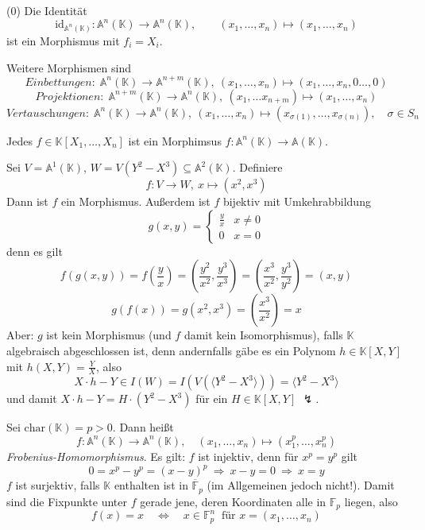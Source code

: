 \documentclass[11pt]{book}
\theoremstyle{nonumberbreak}
\newenvironment{ex}[1][]{\ifthenelse{\equal{#1}{}}{\example}{\example[#1]}\rm}{\endexample}
\begin{document}
\begin{spacing}{1.3}
\begin{ex} %
\begin{compactenum}
\item[(0)] Die Identität $$\textrm{id}_{\mathbb{A}^n(\mathbb{K})}: \mathbb{A}^n(\mathbb{K}) \longrightarrow \mathbb{A}^n(\mathbb{K}),\qquad (x_1, \ldots, x_n) \mapsto (x_1, \ldots, x_n)$$ ist ein Morphismus mit $f_i=X_i$.
\item Weitere Morphismen sind
$$\textit{Einbettungen:} \ \ \mathbb{A}^n(\mathbb{K}) \longrightarrow \mathbb{A}^{n+m}(\mathbb{K}),\ (x_1, \ldots, x_n) \mapsto (x_1, \ldots, x_n, 0 \ldots, 0)$$
$$\textit{Projektionen:} \ \ \mathbb{A}^{n+m}(\mathbb{K}) \longrightarrow \mathbb{A}^n(\mathbb{K}),\ (x_1, \ldots x_{n+m}) \mapsto (x_1,\ldots, x_n)$$
$$\textit{Vertauschungen:} \ \ \mathbb{A}^n(\mathbb{K}) \longrightarrow \mathbb{A}^n(\mathbb{K}),\ (x_1, \ldots, x_n) \mapsto (x_{\sigma(1)}, \ldots, x_{\sigma(n)}), \quad \sigma \in S_n$$
\item Jedes $f \in \mathbb{K}[X_1, \ldots, X_n]$ ist ein Morphimsus $f:\mathbb{A}^n(\mathbb{K}) \longrightarrow \mathbb{A}(\mathbb{K})$.
\item Sei $V=\mathbb{A}^1(\mathbb{K})$, $W=V(Y^2-X^3)\subseteq \mathbb{A}^2(\mathbb{K})$. Definiere
$$f:V\longrightarrow W, \ x \mapsto (x^2, x^3)$$
Dann ist $f$ ein Morphismus. Außerdem ist $f$ bijektiv mit Umkehrabbildung
$$g(x,y)=\begin{cases} \frac{y}{x} & x\neq 0 \\ 0 & x=0 \end{cases}$$
denn es gilt
$$f(g(x,y))=f\left(\frac{y}{x}\right)=\left(\frac{y^2}{x^2}, \frac{y^3}{x^3}\right)=\left(\frac{x^3}{x^2}, \frac{y^3}{y^2}\right)=(x,y)$$
$$g(f(x))=g\left(x^2, x^3\right)=\left(\frac{x^3}{x^2}\right)=x$$
Aber: $g$ ist kein Morphismus (und $f$ damit kein Isomorphismus), falls $\mathbb{K}$ algebraisch abgeschlossen ist, denn andernfalls gäbe es ein Polynom $h \in \mathbb{K}[X,Y]$ mit $h(X,Y)=\frac{Y}{X}$, also
$$X\cdot h - Y \in I(W)=I(V(\langle Y^2-X^3\rangle))=\langle Y^2-X^3 \rangle$$
und damit $X \cdot h - Y = H \cdot (Y^2-X^3)$ für ein $H \in \mathbb{K}[X,Y]$ $\lightning$.
\item Sei $\textrm{char}(\mathbb{K})=p>0$. Dann heißt
$$f: \mathbb{A}^n(\mathbb{K}) \longrightarrow \mathbb{A}^n(\mathbb{K}), \quad (x_1, \ldots, x_n) \mapsto (x_1^p, \ldots, x_n^p)$$
\textit{Frobenius-Homomorphismus}. Es gilt:
$f$ ist injektiv, denn für $x^p=y^p$ gilt
$$0=x^p-y^p=(x-y)^p \ \Longrightarrow \ x-y=0 \ \Longrightarrow \ x=y$$
$f$ ist surjektiv, falls $\mathbb{K}$ enthalten ist in $\overline{\mathbb{F}}_p$ (im Allgemeinen jedoch nicht!).
Damit sind die Fixpunkte unter $f$ gerade jene, deren Koordinaten alle in $\mathbb{F}_p$ liegen, also
$$f(x)=x \quad \Longleftrightarrow \quad x \in \mathbb{F}_p^n \ \textrm{ für } x=(x_1, \ldots, x_n)$$
\end{compactenum}
\end{ex}


\end{spacing}
\end{document}
